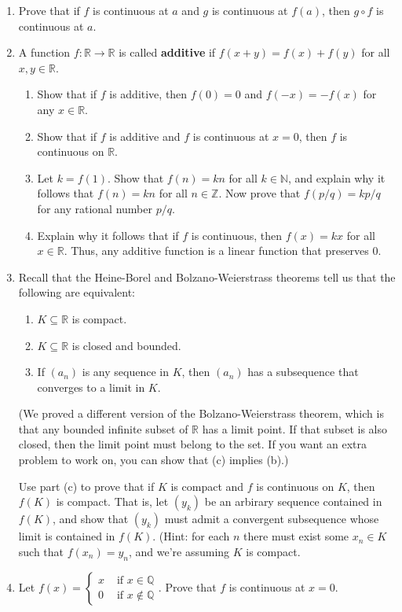 \documentclass[letterpaper,12pt]{article}
\newcommand{\N}{\mathbb{N}}
\newcommand{\Q}{\mathbb{Q}}
\newcommand{\R}{\mathbb{R}}
\newcommand{\Z}{\mathbb{Z}}
\begin{document}
\begin{enumerate}
\item Prove that if $f$ is continuous at $a$ and $g$ is continuous at $f(a)$, then $g\circ f$ is continuous at $a$.
\item A function $f:\R\to\R$ is called {\bf additive} if $f(x+y)=f(x)+f(y)$ for all $x,y\in\R$. 
\begin{enumerate}
 \item Show that if $f$ is additive, then $f(0)=0$ and $f(-x)=-f(x)$ for any $x\in\R$.
 \item Show that if $f$ is additive and $f$ is continuous at $x=0$, then $f$ is continuous on $\R$.
 \item Let $k=f(1)$. Show that $f(n)=kn$ for all $k\in\N$, and explain why it follows that $f(n)=kn$ for all $n\in\Z$. Now prove that $f(p/q) = kp/q$ for any rational number $p/q$.
 \item Explain why it follows that if $f$ is continuous, then $f(x)=kx$ for all $x\in\R$. Thus, any additive function is a linear function that preserves 0.
\end{enumerate}
\item Recall that the Heine-Borel and Bolzano-Weierstrass theorems tell us that the following are equivalent:
\begin{enumerate}
 \item $K\subseteq \R$ is compact.
 \item $K\subseteq \R$ is closed and bounded.
 \item If $(a_n)$ is any sequence in $K$, then $(a_n)$ has a subsequence that converges to a limit in $K$.
\end{enumerate}
(We proved a different version of the Bolzano-Weierstrass theorem, which is that any bounded infinite subset of $\R$ has a limit point. If that subset is also closed, then the limit point must belong to the set. If you want an extra problem to work on, you can show that (c) implies (b).)

Use part (c) to prove that if $K$ is compact and $f$ is continuous on $K$, then $f(K)$ is compact. That is, let $(y_k)$ be an arbirary sequence contained in $f(K)$, and show that $(y_k)$ must admit a convergent subsequence whose limit is contained in $f(K)$. (Hint: for each $n$ there must exist some $x_n\in K$ such that $f(x_n)=y_n$, and we're assuming $K$ is compact.
\item Let $\displaystyle f(x) = \begin{cases} x & \text{ if } x\in \Q\\ 0 & \text{ if } x\notin \Q\end{cases}$. Prove that $f$ is continuous at $x=0$.


\end{enumerate}
\end{document}
